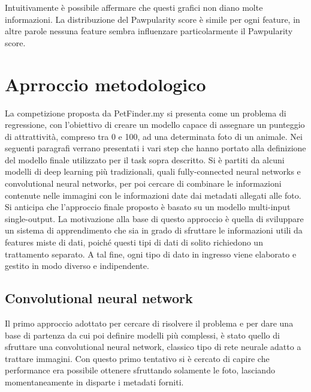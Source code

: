     Intuitivamente è possibile affermare che questi grafici non diano molte informazioni. La distribuzione del Pawpularity score è simile per ogni feature, in altre parole nessuna feature sembra influenzare particolarmente il Pawpularity score.
    \vfill

\section{Aprroccio metodologico}

    La competizione proposta da PetFinder.my si presenta come un problema di regressione, con l'obiettivo di creare un modello capace di assegnare un punteggio di attrattività, 
    compreso tra 0 e 100, ad una determinata foto di un animale.
    Nei seguenti paragrafi verrano presentati i vari step che hanno portato alla definizione del modello finale utilizzato per il task sopra descritto.
    Si è partiti da alcuni modelli di deep learning più tradizionali, quali fully-connected neural networks e convolutional neural networks, per poi cercare di combinare le informazioni
    contenute nelle immagini con le informazioni date dai metadati allegati alle foto.
    Si anticipa che l'approccio finale proposto è basato su un modello multi-input single-output. La motivazione alla base di questo approccio è quella di sviluppare un sistema di 
    apprendimento che sia in grado di sfruttare le informazioni utili da features miste di dati, poiché questi tipi di dati di solito richiedono un trattamento separato. 
    A tal fine, ogni tipo di dato in ingresso viene elaborato e gestito in modo diverso e indipendente.

    \subsection{Convolutional neural network}
    \label{cnn}
        Il primo approccio adottato per cercare di risolvere il problema e per dare una base di partenza da cui poi definire modelli più complessi, è stato quello di sfruttare
        una convolutional neural network, classico tipo di rete neurale adatto a trattare immagini. Con questo primo tentativo si è cercato di capire che performance era possibile
        ottenere sfruttando solamente le foto, lasciando momentaneamente in disparte i metadati forniti.

